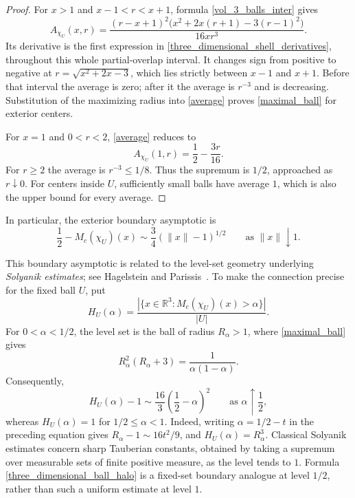 \documentclass[12pt]{amsart}
\numberwithin{equation}{section}
\begin{document}
\begin{proof}
For $x>1$ and $x-1<r<x+1$, formula \eqref{vol_3_balls_inter} gives
\begin{equation}
\label{average}
A_{\chi_U}(x,r)
 =\frac{(r-x+1)^2
       \bigl(x^2+2x(r+1)-3(r-1)^2\bigr)}{16xr^3}.
\end{equation}
Its derivative is the first expression in
\eqref{three_dimensional_shell_derivatives}, throughout this whole
partial-overlap interval. It changes sign from positive to negative
at $r=\sqrt{x^2+2x-3}$, which lies strictly between $x-1$ and $x+1$.
Before that interval the average is zero; after it the average is
$r^{-3}$ and is decreasing. Substitution of the maximizing radius
into \eqref{average} proves \eqref{maximal_ball} for exterior centers.

For $x=1$ and $0<r<2$, \eqref{average} reduces to
\[
A_{\chi_U}(1,r)=\frac12-\frac{3r}{16}.
\]
For $r\geq2$ the average is $r^{-3}\leq1/8$. Thus the supremum
is $1/2$, approached as $r\downarrow0$. For centers inside $U$,
sufficiently small balls have average $1$, which is also the upper
bound for every average.
\end{proof}

In particular, the exterior boundary asymptotic is
\begin{equation}
\label{three_dimensional_boundary_asymptotic}
\frac12-M_c(\chi_U)(x)\sim\frac34(\|x\|-1)^{1/2}
       \qquad\text{as }\|x\|\downarrow1.
\end{equation}

\begin{remark}
This boundary asymptotic is related to the level-set geometry underlying
\emph{Solyanik estimates}; see Hagelstein and
Parissis~\cite{hagelsteinparissis2015}. To make the connection precise
for the fixed ball $U$, put
\[
H_U(\alpha)=\frac{|\{x\in\mathbb{R}^3:
                         M_c(\chi_U)(x)>\alpha\}|}{|U|}.
\]
For $0<\alpha<1/2$, the level set is the ball of radius $R_\alpha>1$,
where \eqref{maximal_ball} gives
\[
R_\alpha^2(R_\alpha+3)=\frac{1}{\alpha(1-\alpha)}.
\]
Consequently,
\begin{equation}
\label{three_dimensional_ball_halo}
H_U(\alpha)-1\sim\frac{16}{3}\left(\frac12-\alpha\right)^2
                   \qquad\text{as }\alpha\uparrow\frac12,
\end{equation}
whereas $H_U(\alpha)=1$ for $1/2\leq\alpha<1$.
Indeed, writing $\alpha=1/2-t$ in the preceding equation gives
$R_\alpha-1\sim16t^2/9$, and $H_U(\alpha)=R_\alpha^3$.
Classical Solyanik estimates concern sharp Tauberian constants, obtained
by taking a supremum over measurable sets of finite positive measure,
as the level tends to $1$. Formula \eqref{three_dimensional_ball_halo}
is a fixed-set boundary analogue at level $1/2$, rather than such a
uniform estimate at level $1$.
\end{remark}
\end{document}
